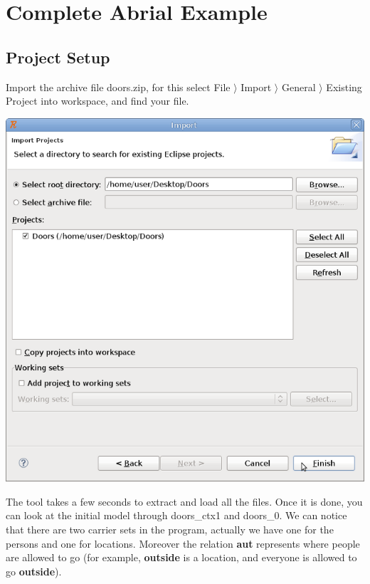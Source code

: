 \section{Complete Abrial Example}
\label{tutorial_10}

\subsection{Project Setup}
Import the archive file doors.zip, for this select  \textsf{File $\rangle$ Import $\rangle$ General $\rangle$ Existing Project into workspace}, and find your file.
\begin{center}
	\includegraphics[]{img/tutorial/import.png}
\end{center}
The tool takes a few seconds to extract and load all the files. Once it is done, you can look at the initial model through doors\_ctx1 and doors\_0.
We can notice that there are two carrier sets in the program, actually we have one for the persons and one for locations. Moreover the relation \textbf{aut} represents where people are allowed to go (for example, \textbf{outside} is a location, and everyone is allowed to go \textbf{outside}).

